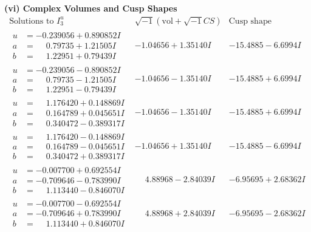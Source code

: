 \documentclass[1p]{elsarticle_modified}
\theoremstyle{definition}
\newcommand{\I}{\sqrt{-1}}
\begin{document}
\newpage\flushleft \textbf{(vi) Complex Volumes and Cusp Shapes}
$$\begin{array}{c|c|c}  
\text{Solutions to }I^u_{3}& \I (\text{vol} + \sqrt{-1}CS) & \text{Cusp shape}\\
 \hline 
\begin{aligned}
u &= -0.239056 + 0.890852 I \\
a &= \phantom{-}0.79735 + 1.21505 I \\
b &= \phantom{-}1.22951 + 0.79439 I\end{aligned}
 & -1.04656 + 1.35140 I & -15.4885 - 6.6994 I \\ \hline\begin{aligned}
u &= -0.239056 - 0.890852 I \\
a &= \phantom{-}0.79735 - 1.21505 I \\
b &= \phantom{-}1.22951 - 0.79439 I\end{aligned}
 & -1.04656 - 1.35140 I & -15.4885 + 6.6994 I \\ \hline\begin{aligned}
u &= \phantom{-}1.176420 + 0.148869 I \\
a &= \phantom{-}0.164789 + 0.045651 I \\
b &= \phantom{-}0.340472 - 0.389317 I\end{aligned}
 & -1.04656 - 1.35140 I & -15.4885 + 6.6994 I \\ \hline\begin{aligned}
u &= \phantom{-}1.176420 - 0.148869 I \\
a &= \phantom{-}0.164789 - 0.045651 I \\
b &= \phantom{-}0.340472 + 0.389317 I\end{aligned}
 & -1.04656 + 1.35140 I & -15.4885 - 6.6994 I \\ \hline\begin{aligned}
u &= -0.007700 + 0.692554 I \\
a &= -0.709646 - 0.783990 I \\
b &= \phantom{-}1.113440 - 0.846070 I\end{aligned}
 & \phantom{-}4.88968 - 2.84039 I & -6.95695 + 2.68362 I \\ \hline\begin{aligned}
u &= -0.007700 - 0.692554 I \\
a &= -0.709646 + 0.783990 I \\
b &= \phantom{-}1.113440 + 0.846070 I\end{aligned}
 & \phantom{-}4.88968 + 2.84039 I & -6.95695 - 2.68362 I \\ \hline\begin{aligned}

\end{aligned}
\end{array}$$
\end{document}
